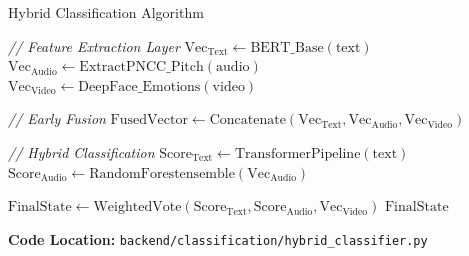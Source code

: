 \documentclass[11pt]{beamer}
\begin{document}
\begin{frame}[fragile]{Hybrid Classification Algorithm}
    \vspace{-0.4cm}
    {\footnotesize
    \begin{algorithm}[H]
    \caption{Hybrid Classification Algorithm}
    \begin{algorithmic}[1]
        \State \textit{// Feature Extraction Layer}
        \State $\mathrm{Vec}_{\mathrm{Text}} \gets \mathrm{BERT\_Base}(\mathrm{text})$ 
        \State $\mathrm{Vec}_{\mathrm{Audio}} \gets \mathrm{ExtractPNCC\_Pitch}(\mathrm{audio})$ 
        \State $\mathrm{Vec}_{\mathrm{Video}} \gets \mathrm{DeepFace\_Emotions}(\mathrm{video})$ 
        
        \State \textit{// Early Fusion}
        \State $\mathrm{FusedVector} \gets \mathrm{Concatenate}(\mathrm{Vec}_{\mathrm{Text}}, \mathrm{Vec}_{\mathrm{Audio}}, \mathrm{Vec}_{\mathrm{Video}})$
        
        \State \textit{// Hybrid Classification}
        \State $\mathrm{Score}_{\mathrm{Text}} \gets \mathrm{TransformerPipeline}(\mathrm{text})$
        \State $\mathrm{Score}_{\mathrm{Audio}} \gets \mathrm{RandomForestensemble}(\mathrm{Vec}_{\mathrm{Audio}})$
        
        \State $\mathrm{FinalState} \gets \mathrm{WeightedVote}(\mathrm{Score}_{\mathrm{Text}}, \mathrm{Score}_{\mathrm{Audio}}, \mathrm{Vec}_{\mathrm{Video}})$
        \State \Return $\mathrm{FinalState}$
    \EndProcedure
    \end{algorithmic}
    \end{algorithm}
    }
    \vspace{0.2cm}
    \centering
    {\footnotesize \textbf{Code Location:} \texttt{backend/classification/hybrid\_classifier.py}}
\end{frame}
\end{document}
